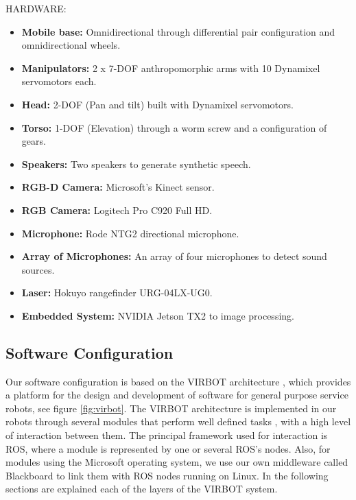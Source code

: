 \documentclass{llncs}
\begin{document}
HARDWARE:

\begin{itemize}
	\item \textbf{Mobile base:} Omnidirectional through differential pair configuration and omnidirectional wheels. 
	\item \textbf{Manipulators:} 2 x 7-DOF anthropomorphic arms with 10 Dynamixel servomotors each.
	\item \textbf{Head:} 2-DOF (Pan and tilt) built with Dynamixel servomotors.
	\item \textbf{Torso:} 1-DOF (Elevation) through a worm screw and a configuration of gears. 
	\item \textbf{Speakers:} Two speakers to generate synthetic speech.
	\item \textbf{RGB-D Camera:} Microsoft's Kinect sensor. 
	\item \textbf{RGB Camera:} Logitech Pro C920 Full HD.
	\item \textbf{Microphone:} Rode NTG2 directional microphone.
	\item \textbf{Array of Microphones:} An array of four microphones to detect sound sources.
	\item \textbf{Laser:} Hokuyo rangefinder URG-04LX-UG0.
	\item \textbf{Embedded System:} NVIDIA Jetson TX2 to image processing.
\end{itemize}



\subsection{Software Configuration}
Our software configuration is based on the VIRBOT architecture \cite{virbot}, 
which provides a platform for the design and development of software for general purpose service robots, see figure \ref{fig:virbot}. 
The VIRBOT architecture is implemented in our robots through several modules that perform well defined tasks \cite{muller}, with a 
high level of interaction between them. The principal framework used for interaction is ROS, where a module is represented by one or 
several ROS's nodes. Also, for modules using the Microsoft operating system, we use our own middleware called Blackboard to
link them with ROS nodes running on Linux.
In the following sections are explained each of the layers of the VIRBOT system.
\end{document}
